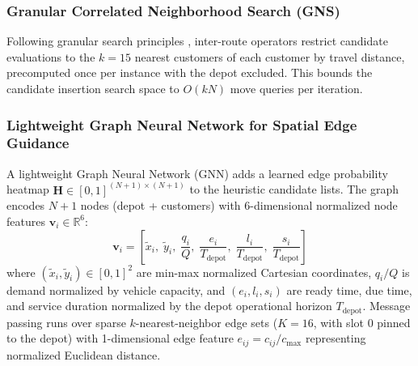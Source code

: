 \documentclass{ieeeaccess}
\begin{document}
\subsubsection{Granular Correlated Neighborhood Search (GNS)}
Following granular search principles \cite{toth2003granular}, inter-route operators restrict candidate evaluations to the $k=15$ nearest customers of each customer by travel distance, precomputed once per instance with the depot excluded. This bounds the candidate insertion search space to $O(k N)$ move queries per iteration.

\subsubsection{Lightweight Graph Neural Network for Spatial Edge Guidance}
\label{sec:gnn_guidance}
A lightweight Graph Neural Network (GNN) adds a learned edge probability heatmap $\mathbf{H} \in [0, 1]^{(N+1)\times (N+1)}$ to the heuristic candidate lists. The graph encodes $N+1$ nodes (depot + customers) with 6-dimensional normalized node features $\mathbf{v}_i \in \mathbb{R}^6$:
\begin{equation}
  \mathbf{v}_i = \left[ \tilde{x}_i, \; \tilde{y}_i, \; \frac{q_i}{Q}, \; \frac{e_i}{T_{\text{depot}}}, \; \frac{l_i}{T_{\text{depot}}}, \; \frac{s_i}{T_{\text{depot}}} \right]
  \label{eq:gnn_node_feats}
\end{equation}
where $(\tilde{x}_i, \tilde{y}_i) \in [0, 1]^2$ are min-max normalized Cartesian coordinates, $q_i / Q$ is demand normalized by vehicle capacity, and $(e_i, l_i, s_i)$ are ready time, due time, and service duration normalized by the depot operational horizon $T_{\text{depot}}$. Message passing runs over sparse $k$-nearest-neighbor edge sets ($K=16$, with slot 0 pinned to the depot) with 1-dimensional edge feature $e_{ij} = c_{ij} / c_{\max}$ representing normalized Euclidean distance.
\end{document}
